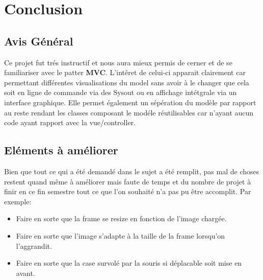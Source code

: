 \documentclass[12pt]{article}
\begin{document}
\section{Conclusion}
\subsection{Avis Général}
Ce projet fut trés instructif et nous aura mieux permis de cerner et de se familiariser avec le patter \textbf{MVC}. L'intêret de celui-ci apparait clairement car permettant différentes visualisations du model sans avoir à le changer que cela soit en ligne de commande via des Sysout ou en affichage intétgrale via un interface graphique. Elle permet également un sépération du modèle par rapport au reste rendant les classes composant le modéle réutilisables car n'ayant aucun code ayant rapport avec la vue/controller.
\subsection{Eléments à améliorer}
Bien que tout ce qui a été demandé dans le sujet a été remplit, pas mal de choses restent quand même à améliorer mais faute de temps et du nombre de projet à finir en ce fin semestre
tout ce que l'on souhaité n'a pas pu être accomplit.
Par exemple:
\begin{itemize}
	\item Faire en sorte que la frame se resize en fonction de l'image chargée.
	\item Faire en sorte que l'image s'adapte à la taille de la frame lorsqu'on l'aggrandit.
	\item Faire en sorte que la case survolé par la souris si déplacable soit mise en avant.
\end{itemize}
\end{document}
